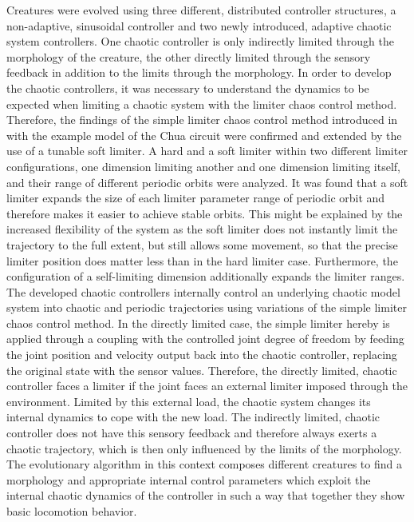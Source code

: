 \documentclass[main]{subfiles}
\begin{document}
Creatures were evolved using three different, distributed controller structures, a non-adaptive, sinusoidal controller and two newly introduced, adaptive chaotic system controllers. %
%
One chaotic controller is only indirectly limited through the morphology of the creature, the other directly limited through the sensory feedback in addition to the limits through the morphology. %
%
In order to develop the chaotic controllers, it was necessary to understand the dynamics to be expected when limiting a chaotic system with the limiter chaos control method. %
%
Therefore, the findings of the simple limiter chaos control method introduced in \cite{bib:Corron2000} with the example model of the Chua circuit \cite{bib:Matsumoto1985} were confirmed and extended by the use of a tunable soft limiter. %
%
A hard and a soft limiter within two different limiter configurations, one dimension limiting another and one dimension limiting itself, and their range of different periodic orbits were analyzed. %
%
It was found that a soft limiter expands the size of each limiter parameter range of periodic orbit and therefore makes it easier to achieve stable orbits. %
%
This might be explained by the increased flexibility of the system as the soft limiter does not instantly limit the trajectory to the full extent, but still allows some movement, so that the precise limiter position does matter less than in the hard limiter case. %
%
Furthermore, the configuration of a self-limiting dimension additionally expands the limiter ranges. %
%
The developed chaotic controllers internally control an underlying chaotic model system into chaotic and periodic trajectories using variations of the simple limiter chaos control method. %
%
In the directly limited case, the simple limiter hereby is applied through a coupling with the controlled joint degree of freedom by feeding the joint position and velocity output back into the chaotic controller, replacing the original state with the sensor values. %
%
Therefore, the directly limited, chaotic controller faces a limiter if the joint faces an external limiter imposed through the environment. %
%
Limited by this external load, the chaotic system changes its internal dynamics to cope with the new load. %
%
The indirectly limited, chaotic controller does not have this sensory feedback and therefore always exerts a chaotic trajectory, which is then only influenced by the limits of the morphology. %
%
The evolutionary algorithm in this context composes different creatures to find a morphology and appropriate internal control parameters which exploit the internal chaotic dynamics of the controller in such a way that together they show basic locomotion behavior. %
\end{document}
